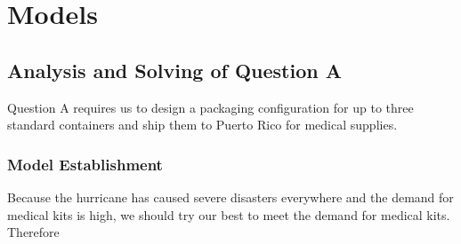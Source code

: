 \documentclass[a4paper,12pt]{article}
\begin{document}
	\section{Models}
	\subsection{Analysis and Solving of Question A}
	Question A requires us to design a packaging configuration for up to three standard
	containers and ship them to Puerto Rico for medical supplies.
	\subsubsection{Model Establishment}
	Because the hurricane has caused severe disasters everywhere and the demand for medical
	kits is high, we should try our best to meet the demand for medical kits. Therefore
	
\end{document}
